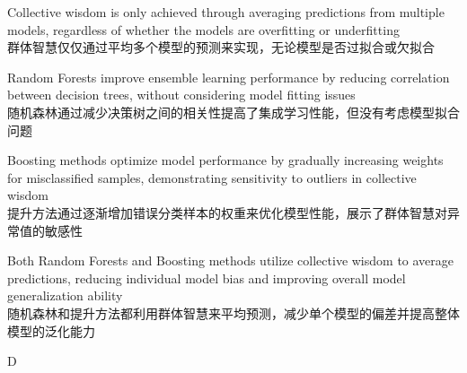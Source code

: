 \documentclass{article}
\begin{document}
\begin{choices}
    \item Collective wisdom is only achieved through averaging predictions from multiple models, regardless of whether the models are overfitting or underfitting\\
    群体智慧仅仅通过平均多个模型的预测来实现，无论模型是否过拟合或欠拟合
    \item Random Forests improve ensemble learning performance by reducing correlation between decision trees, without considering model fitting issues\\
    随机森林通过减少决策树之间的相关性提高了集成学习性能，但没有考虑模型拟合问题
    \item Boosting methods optimize model performance by gradually increasing weights for misclassified samples, demonstrating sensitivity to outliers in collective wisdom\\
    提升方法通过逐渐增加错误分类样本的权重来优化模型性能，展示了群体智慧对异常值的敏感性
    \item Both Random Forests and Boosting methods utilize collective wisdom to average predictions, reducing individual model bias and improving overall model generalization ability\\
    随机森林和提升方法都利用群体智慧来平均预测，减少单个模型的偏差并提高整体模型的泛化能力
\end{choices}

\begin{correctanswer}
D
\end{correctanswer}
\end{document}
